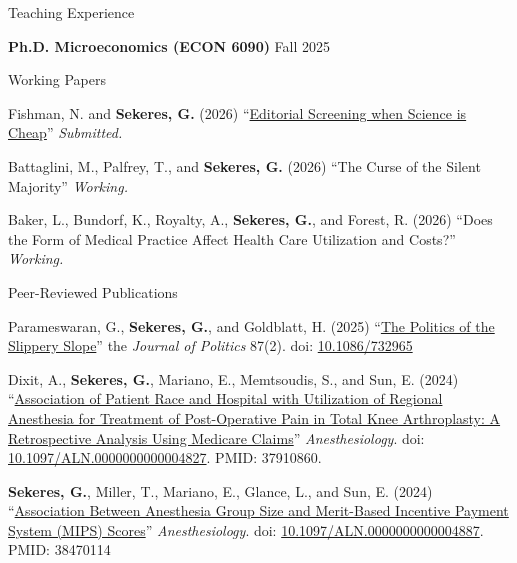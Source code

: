 \documentclass{resume}
\begin{document}
\begin{rSection}{Teaching Experience}
	\item \textbf{Ph.D. Microeconomics (ECON 6090)} \hfill Fall 2025
\end{rSection}
\begin{rSection}{Working Papers}
\vspace{-0.5cm}
\item Fishman, N. and \textbf{Sekeres, G.} (2026) ``\href{https://gabesekeres.com/papers/cheap_science/gsekeres_cheap_science.pdf}{Editorial Screening when Science is Cheap}'' \emph{Submitted.}

\item Battaglini, M., Palfrey, T., and \textbf{Sekeres, G.} (2026) ``The Curse of the Silent Majority'' \emph{Working.}

\item Baker, L., Bundorf, K., Royalty, A., \textbf{Sekeres, G.}, and Forest, R. (2026) ``Does the Form of Medical Practice Affect Health Care Utilization and Costs?'' \emph{Working.}
\end{rSection}

\begin{rSection}{Peer-Reviewed Publications}
\vspace{-0.5cm}
	\item Parameswaran, G., \textbf{Sekeres, G.}, and Goldblatt, H. (2025) ``\href{https://gabesekeres.com/papers/slippery_slope/gsekeres_slippery_slope.pdf}{The Politics of the Slippery Slope}'' the \emph{Journal of Politics} 87(2). doi: \href{https://doi.org/10.1086/732965}{10.1086/732965}
    \item Dixit, A., \textbf{Sekeres, G.}, Mariano, E., Memtsoudis, S., and Sun, E. (2024) ``\href{https://gabesekeres.com/papers/nerve_blocks/gsekeres_tka_paper.pdf}{Association of Patient Race and Hospital with Utilization of Regional Anesthesia for Treatment of Post-Operative Pain in Total Knee Arthroplasty: A Retrospective Analysis Using Medicare Claims}'' \emph{Anesthesiology}. doi: \href{https://doi.org/10.1097/aln.0000000000004827}{10.1097/ALN.0000000000004827}. PMID: 37910860.
    \item \textbf{Sekeres, G.}, Miller, T., Mariano, E., Glance, L., and Sun, E. (2024) ``\href{https://gabesekeres.com/papers/mips/gsekeres_mips_paper.pdf}{Association Between Anesthesia Group Size and Merit-Based Incentive Payment System (MIPS) Scores}'' \emph{Anesthesiology}. doi: \href{https://doi.org/10.1097/ALN.0000000000004887}{10.1097/ALN.0000000000004887}. PMID: 38470114
\end{rSection}
\end{document}
